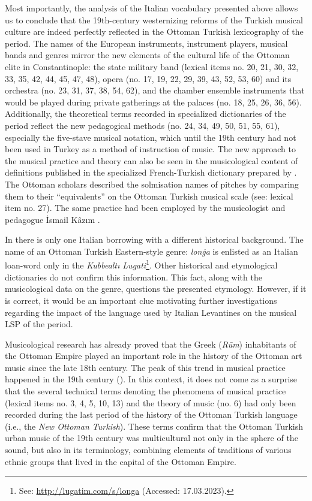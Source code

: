 \documentclass[output=paper,colorlinks,citecolor=brown,arabicfont,chinesefont]{langscibook}
\begin{document}
Most importantly, the analysis of the Italian vocabulary presented above allows us to conclude that the 19th-century westernizing reforms of the Turkish musical culture are indeed perfectly reflected in the Ottoman Turkish lexicography of the period. The names of the European instruments, instrument players, musical bands and genres mirror the new elements of the cultural life of the Ottoman elite in Constantinople: the state military band (lexical items no. 20, 21, 30, 32, 33, 35, 42, 44, 45, 47, 48), opera (no. 17, 19, 22, 29, 39, 43, 52, 53, 60) and its orchestra (no. 23, 31, 37, 38, 54, 62), and the chamber ensemble instruments that would be played during private gatherings at the palaces (no. 18, 25, 26, 36, 56). Additionally, the theoretical terms recorded in specialized dictionaries of the period reflect the new pedagogical methods (no. 24, 34, 49, 50, 51, 55, 61), especially the five-stave musical notation, which until the 19th century had not been used in Turkey as a method of instruction of music. The new approach to the musical practice and theory can also be seen in the musicological content of definitions published in the specialized French-Turkish dictionary prepared by \citet{TinghirSinapian1891}. The Ottoman scholars described the solmisation names of pitches by comparing them to their “equivalents” on the Ottoman Turkish musical scale (see: lexical item no. 27). The same practice had been employed by the musicologist and pedagogue İsmail Kâzım \citet{Uz1892}.

In  there is only one Italian borrowing with a different historical background. The name of an Ottoman Turkish Eastern-style genre: \emph{lonġa} is enlisted as an Italian loan-word only in the \emph{Kubbealtı Lugati}\footnote{See: \url{http://lugatim.com/s/longa} (Accessed: 17.03.2023).}. Other historical and etymological dictionaries do not confirm this information. This fact, along with the musicological data on the genre, questions the presented etymology. However, if it is correct, it would be an important clue motivating further investigations regarding the impact of the language used by Italian Levantines on the musical LSP of the period.

Musicological research has already proved that the Greek (\emph{Rūm}) inhabitants of the Ottoman Empire played an important role in the history of the Ottoman art music since the late 18th century. The peak of this trend in musical practice happened in the 19th century (\citealt{Behar2006, Feldman1996, Greve2015}). In this context, it does not come as a surprise that the several technical terms denoting the phenomena of musical practice (lexical items no. 3, 4, 5, 10, 13) and the theory of music (no. 6) had only been recorded during the last period of the history of the Ottoman Turkish language (i.e., the \emph{New Ottoman Turkish}). These terms confirm that the Ottoman Turkish urban music of the 19th century was multicultural not only in the sphere of the sound, but also in its terminology, combining elements of traditions of various ethnic groups that lived in the capital of the Ottoman Empire.
\end{document}
